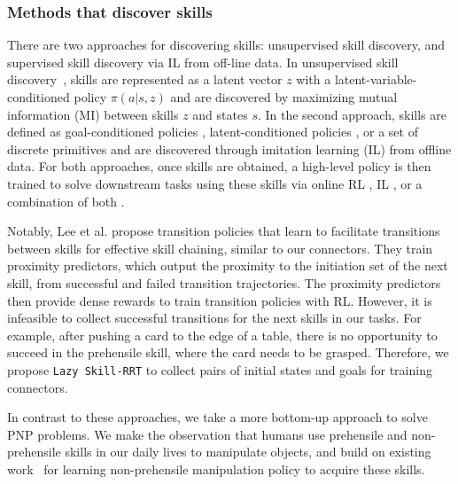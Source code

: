 \subsubsection{Methods that discover skills}
There are two approaches for discovering skills: unsupervised skill discovery, and supervised skill discovery via IL from off-line data.
In unsupervised skill discovery~\cite{eysenbach2018diversity, sharma2019dynamics, lee2019learning, park2022lipschitz, park2023controllability}, skills are represented as a latent vector $z$ with a latent-variable-conditioned policy $\pi(a|s,z)$ and are discovered by maximizing mutual information (MI) between skills $z$ and states $s$. In the second approach, skills are defined as goal-conditioned policies \cite{mandlekar2020iris, gupta2020relay}, latent-conditioned policies \cite{pertsch2021accelerating, rosete2023latent}, or a set of discrete primitives \cite{lee2019composing} and are discovered through imitation learning (IL) from offline data. For both approaches, once skills are obtained, a high-level policy is then trained to solve downstream tasks using these skills via online RL \cite{pertsch2021accelerating, zhang2024extract}, IL \cite{mulling2013learning, mandlekar2020iris, rosete2023latent, garrett2024skillmimicgen}, or a combination of both \cite{gupta2020relay}. 

Notably, Lee et al. \cite{lee2019composing} propose transition policies that learn to facilitate transitions between skills for effective skill chaining, similar to our connectors. They train proximity predictors, which output the proximity to the initiation set of the next skill, from successful and failed transition trajectories. The proximity predictors then provide dense rewards to train transition policies with RL. However, it is infeasible to collect successful transitions for the next skills in our tasks. For example, after pushing a card to the edge of a table, there is no opportunity to succeed in the prehensile skill, where the card needs to be grasped. Therefore, we propose \texttt{Lazy Skill-RRT} to collect pairs of initial states and goals for training connectors.


In contrast to these approaches, we take a more bottom-up approach to solve PNP problems. We make the observation that humans use prehensile and non-prehensile skills in our daily lives to manipulate objects, and build on existing work~\cite{kim2023pre} for learning non-prehensile manipulation policy to acquire these skills.

